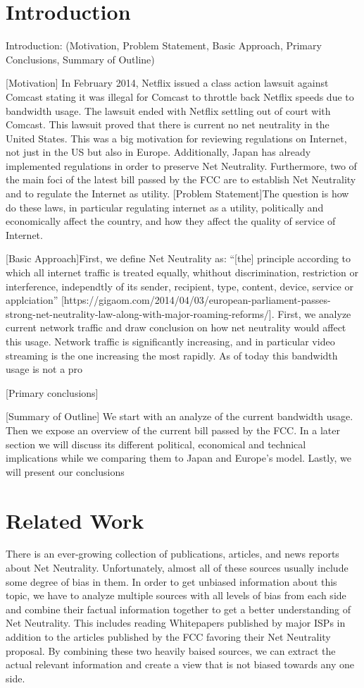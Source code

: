 \documentclass{sigcomm-alternate}
\begin{document}
\section{Introduction}
Introduction: (Motivation, Problem Statement, Basic Approach, Primary Conclusions, Summary of Outline)

[Motivation] In February 2014, Netflix issued a class action lawsuit against Comcast stating it was illegal for Comcast to throttle back Netflix speeds due to bandwidth usage.  The lawsuit ended with Netflix settling out of court with Comcast. This lawsuit proved that there is current no net neutrality in the United States. This was a big motivation for reviewing regulations on Internet, not just in the US but also in Europe. Additionally, Japan has already implemented regulations in order to preserve Net Neutrality. Furthermore, two of the main foci of the latest bill passed by the FCC are to establish Net Neutrality and to regulate the Internet as utility. [Problem Statement]The question is how do these laws, in particular regulating internet as a utility, politically and economically affect the country, and how they affect the quality of service of Internet. 

[Basic Approach]First, we define Net Neutrality as: “[the] principle according to which all internet traffic is treated equally, whithout discrimination, restriction or interference, independtly of its sender, recipient, type, content, device, service or applciation” [https://gigaom.com/2014/04/03/european-parliament-passes-strong-net-neutrality-law-along-with-major-roaming-reforms/]. First, we analyze current network traffic and draw conclusion on how net neutrality would affect this usage. Network traffic is significantly increasing, and in particular video streaming is the one increasing the most rapidly. As of today this bandwidth usage is not a pro 

[Primary conclusions]

[Summary of Outline] We start with an analyze of the current bandwidth usage. Then we expose an overview of the current bill passed by the FCC. In a later section we will discuss its different political, economical and technical implications while we comparing them to Japan and Europe’s model. Lastly, we will present our conclusions


\section{Related Work}
There is an ever-growing collection of publications, articles, and news reports about Net Neutrality. Unfortunately, almost all of these sources usually include some degree of bias in them. In order to get unbiased information about this topic, we have to analyze multiple sources with all levels of bias from each side and combine their factual information together to get a better understanding of Net Neutrality. This includes reading Whitepapers published by major ISPs in addition to the articles published by the FCC favoring their Net Neutrality proposal. By combining these two heavily baised sources, we can extract the actual relevant information and create a view that is not biased towards any one side.
\end{document}
